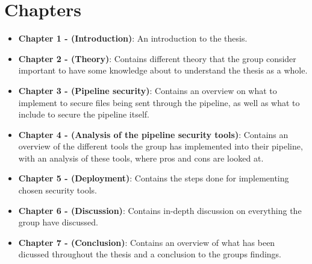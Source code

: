\section{Chapters}
\begin{itemize}
    \item \textbf{Chapter 1 - (Introduction)}: An introduction to the thesis.
    \item \textbf{Chapter 2 - (Theory)}: Contains different theory that the group consider important 
    to have some knowledge about to understand the thesis as a whole.
    \item \textbf{Chapter 3 - (Pipeline security)}: Contains an overview on what to implement to secure files being sent through the pipeline, as well as what to include to secure the pipeline itself. 
    \item \textbf{Chapter 4 - (Analysis of the pipeline security tools)}: Contains an overview of the different tools the group has implemented into their pipeline, with an analysis of these tools, where pros and cons are looked at. 
    \item \textbf{Chapter 5 - (Deployment)}: Contains the steps done for implementing chosen security tools. 
    \item \textbf{Chapter 6 - (Discussion)}: Contains in-depth discussion on everything the group have discussed. 
    \item \textbf{Chapter 7 - (Conclusion)}: Contains an overview of what has been dicussed throughout the thesis and a conclusion to the groups findings. 

\end{itemize}






